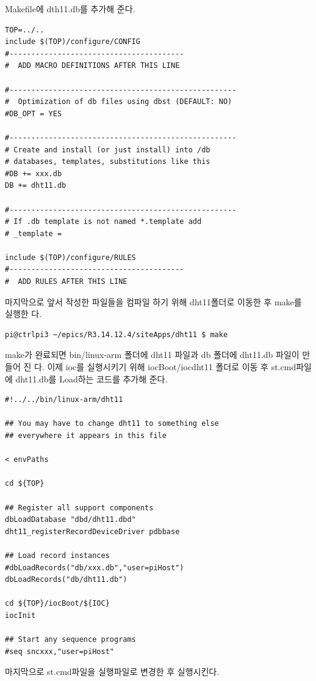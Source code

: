 \documentclass[11pt
  , a4paper
  , article
  , oneside
]{memoir}
\begin{document}
Makefile에 dth11.db를 추가해 준다.
\begin{lstlisting}[style=termstyle]
TOP=../..
include $(TOP)/configure/CONFIG
#----------------------------------------
#  ADD MACRO DEFINITIONS AFTER THIS LINE

#----------------------------------------------------
#  Optimization of db files using dbst (DEFAULT: NO)
#DB_OPT = YES

#----------------------------------------------------
# Create and install (or just install) into /db
# databases, templates, substitutions like this
#DB += xxx.db
DB += dht11.db

#----------------------------------------------------
# If .db template is not named *.template add
# _template = 

include $(TOP)/configure/RULES
#----------------------------------------
#  ADD RULES AFTER THIS LINE
\end{lstlisting}
마지막으로 앞서 작성한 파일들을 컴파일 하기 위해 dht11폴더로 이동한 후 make를 실행한
다.
\begin{lstlisting}[style=termstyle]
pi@ctrlpi3 ~/epics/R3.14.12.4/siteApps/dht11 $ make
\end{lstlisting}
make가 완료되면 bin/linux-arm 폴더에 dht11 파일과 db 폴더에 dht11.db 파일이 만들어 진
다. 이제 ioc를 실행시키기 위해 iocBoot/iocdht11 폴더로 이동 후 st.cmd파일에 dht11.db를
Load하는 코드를 추가해 준다.
\begin{lstlisting}[style=termstyle]
#!../../bin/linux-arm/dht11

## You may have to change dht11 to something else
## everywhere it appears in this file

< envPaths

cd ${TOP}

## Register all support components
dbLoadDatabase "dbd/dht11.dbd"
dht11_registerRecordDeviceDriver pdbbase

## Load record instances
#dbLoadRecords("db/xxx.db","user=piHost")
dbLoadRecords("db/dht11.db")

cd ${TOP}/iocBoot/${IOC}
iocInit

## Start any sequence programs
#seq sncxxx,"user=piHost"
\end{lstlisting}
마지막으로 st.cmd파일을 실행파일로 변경한 후 실행시킨다.
\end{document}
